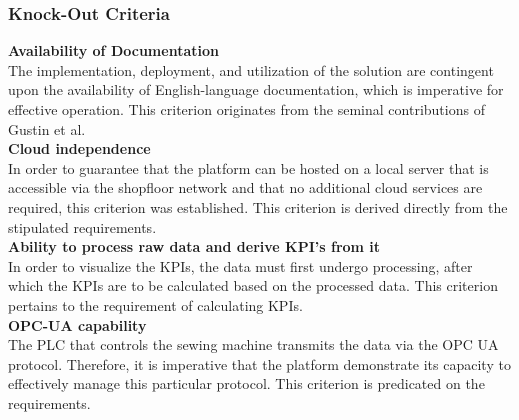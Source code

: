 \subsubsection{Knock-Out Criteria}
\textbf{Availability of Documentation}\\
The implementation, deployment, and utilization of the solution are contingent upon the availability of English-language documentation, which is imperative for effective operation. This criterion originates from the seminal contributions of Gustin et al.\\
\textbf{Cloud independence}\\
In order to guarantee that the platform can be hosted on a local server that is accessible via the shopfloor network and that no additional cloud services are required, this criterion was established. This criterion is derived directly from the stipulated requirements.\\
\textbf{Ability to process raw data and derive KPI's from it}\\
In order to visualize the KPIs, the data must first undergo processing, after which the KPIs are to be calculated based on the processed data. This criterion pertains to the requirement of calculating KPIs. \\
\textbf{OPC-UA capability}\\
The PLC that controls the sewing machine transmits the data via the OPC UA protocol. Therefore, it is imperative that the platform demonstrate its capacity to effectively manage this particular protocol. This criterion is predicated on the requirements.

